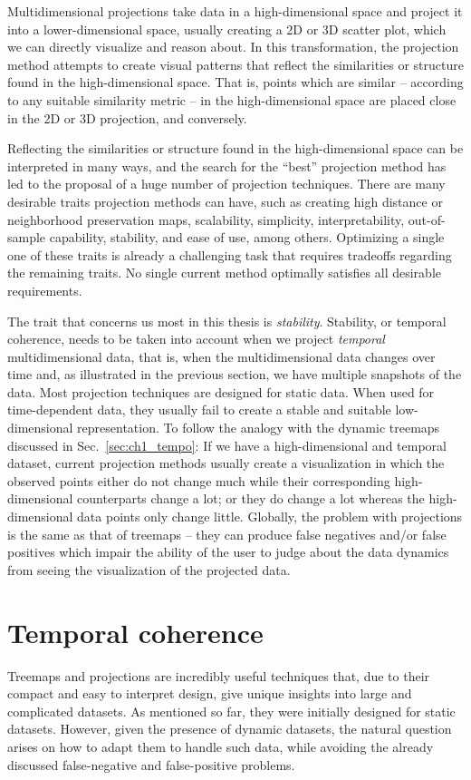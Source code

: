 Multidimensional projections take data in a high-dimensional space and project it into a lower-dimensional space, usually creating a 2D or 3D scatter plot, which we can directly visualize and reason about. In this transformation, the projection method attempts to create visual patterns that reflect the similarities or structure found in the high-dimensional space. That is, points which are similar -- according to any suitable similarity metric -- in the high-dimensional space are placed close in the 2D or 3D projection, and conversely.

Reflecting the similarities or structure found in the high-dimensional space can be interpreted in many ways, and the search for the ``best'' projection method has led to the proposal of a huge number of projection techniques.
There are many desirable traits projection methods can have, such as creating high distance or neighborhood preservation maps, scalability, simplicity, interpretability, out-of-sample capability, stability, and ease of use, among others. 
Optimizing a single one of these traits is already a challenging task that requires tradeoffs regarding the remaining traits. No single current method optimally satisfies all desirable requirements.

The trait that concerns us most in this thesis is \emph{stability}. Stability, or temporal coherence, needs to be taken into account when we project \emph{temporal} multidimensional data, that is, when the multidimensional data changes over time and, as illustrated in the previous section, we have multiple snapshots of the data. Most projection techniques are designed for static data. When used for time-dependent data, they usually fail to create a stable and suitable low-dimensional representation. To follow the analogy with the dynamic treemaps discussed in Sec.~\ref{sec:ch1_tempo}: If we have a high-dimensional and temporal dataset, current projection methods usually create a visualization in which the observed points either do not change much while their corresponding high-dimensional counterparts change a lot; or they do change a lot whereas the high-dimensional data points only change little. Globally, the problem with projections is the same as that of treemaps -- they can produce false negatives and/or false positives which impair the ability of the user to judge about the data dynamics from seeing the visualization of the projected data.

\section{Temporal coherence}
\label{sec:ch1_coherence}
%
Treemaps and projections are incredibly useful techniques that, due to their compact and easy to interpret design, give unique insights into large and complicated datasets.
As mentioned so far, they were initially designed for static datasets. However, given the presence of dynamic datasets, the natural question arises on how to adapt them to handle such data, while avoiding the already discussed false-negative and false-positive problems. 

